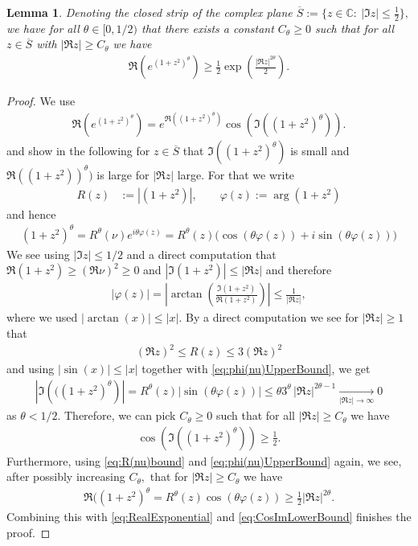\documentclass[11pt]{amsart}
\newcommand{\1}{\mathbbm{1}}
\renewcommand{\phi}{\varphi}
\theoremstyle{plain}
\newtheorem{lemma}[theorem]{Lemma}
\theoremstyle{definition}
\theoremstyle{remark}
\numberwithin{equation}{section}
\begin{document}
\begin{lemma}
\label{lem:RealPartBig}
Denoting the closed strip of the complex plane $
\overline S:=\{z\in\mathbb C:\ |\Im z|\le \tfrac12\},
$ we have for all $\theta\in[0,1/2)$ that there exists a constant  $C_\theta\ge 0$ such that for all $z\in \overline S$ with $|\Re z| \ge  C_\theta$ we have
\begin{align}
\label{eq:LowerBoundRealPart}
\Re\left(e^{(1+z^2)^\theta}\right) \ge \frac{1}{2} \exp\left(\frac{|\Re z|^{2\theta}}{2}\right).
\end{align}
\end{lemma}
\begin{proof}
We use
\begin{align}
\label{eq:RealExponential}
\Re\left(e^{(1+z^2)^\theta}\right)  = e^{\Re((1+z^2)^\theta)} \cos(\Im((1+z^2)^\theta)).
\end{align}
and show in the following for $z\in \overline S$ that $\Im((1+z^2)^\theta)$ is small and $\Re((1+z^2))^\theta)$ is large for $|\Re z|$ large.
For that we write 
\begin{align*}
    R(z) &:= |(1+z^2)|, \qquad \phi(z) := \operatorname{arg}(1+z^2) 
\end{align*}
and hence 
\begin{align*}
    (1+z^2)^\theta = R^\theta(\nu) e^{i\theta \phi(z)} = R^{\theta}(z)\Big(\cos(\theta \phi(z)) + i\sin(\theta\phi(z))\Big)
\end{align*}
 We see using $|\Im z|\le 1/2$ and a direct computation that $\Re(1+z^2)\ge (\Re\nu)^2\ge 0$ and $|\Im(1+z^2)| \le |\Re z|$ and therefore
\begin{align}
\label{eq:phi(nu)UpperBound}
    \left|\phi(z)\right| = \left|\arctan\left(\frac{\Im\left(1+z^2\right)}{\Re\left(1+z^2\right)}\right)\right| \le \frac{1}{|\Re z|},
\end{align}
where we used $|\!\arctan(x)|\le |x|.$  By a direct computation we see for $|\Re z|\ge 1$ that \begin{align}
\label{eq:R(nu)bound}
  (\Re z)^2 \le R(z) \le 3(\Re z)^2
\end{align} and using $|\!\sin(x)| \le |x|$ together with \eqref{eq:phi(nu)UpperBound}, we get
\begin{align*}
   \left| \Im\left(((1+z^2)^\theta\right)\right| = R^\theta(z)|\sin(\theta\phi(z))|\le  \theta 3^\theta \, |\Re z|^{2\theta -1} \xrightarrow[|\Re z|\to\infty]{} 0 
\end{align*}
as $\theta<1/2.$ Therefore, we can pick $C_\theta\ge 0$ such that for all $|\Re z|\ge C_\theta$ we have
\begin{align}
\label{eq:CosImLowerBound}
\cos\left(\Im\left((1+z^2)^\theta\right)\right) \ge \frac{1}{2}.
\end{align}
Furthermore, using \eqref{eq:R(nu)bound} and \eqref{eq:phi(nu)UpperBound} again, we see, after possibly increasing $C_\theta,$ that for $|\Re z| \ge C_\theta$ we have
\begin{align}
    \Re((1+z^2)^\theta = R^{\theta}(z) \cos\left(\theta \phi(z)\right) \ge \frac{1}{2}|\Re z|^{2\theta}. 
\end{align}
Combining this with \eqref{eq:RealExponential} and  \eqref{eq:CosImLowerBound} finishes the proof.
\end{proof}
\end{document}
